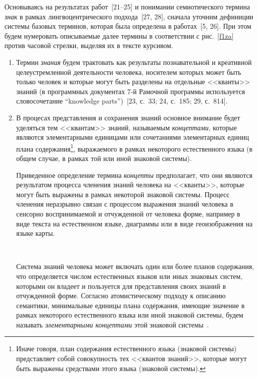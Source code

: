 \begin{multicols}{2}
   Основываясь на результатах работ~[21--25] и понимании семиотического термина
\textit{знак} в рамках лингвоцентрического подхода~[27, 28], сначала уточним дефиниции
системы базовых терминов, которая была определена в работах~[5, 26]. При этом будем
нумеровать описываемые далее термины в соответствии с рис.~\ref{f1za} против часовой
стрелки, выделяя их в тексте курсивом.
   \begin{enumerate}[1.]
   \item Термин \textit{знания} будем трактовать как результаты познавательной и
креативной целеустремленной деятельности человека, носителем которых может быть
только человек и которые могут быть разделены на отдельные <<кванты>> знаний (в
программных документах 7-й Рамочной программы используется словосочетание
``knowledge parts'')~[23, с.~33; 24, с.~185; 29, с.~814].
   \item В процесах представления и сохранения знаний основное внимание будет уделяться
тем <<квантам>> знаний, называемым \textit{концептами}, которые являются
элементарными единицами или сочетаниями элементарных единиц плана
содержания\footnote{Иначе говоря, план содержания естественного языка (знаковой системы)
представляет собой совокупность тех <<квантов знаний>>, которые могут быть выражены средствами
этого языка (знаковой системы).}, выражаемого в рамках некоторого естественного языка (в
общем случае, в рамках той или иной знаковой системы).

   Приведенное определение термина \textit{концепты} предполагает, что они являются
результатом процесса членения знаний человека на <<кванты>>, которые могут быть
выражены в рамках некоторой знаковой системы. Процесс членения неразрывно связан с
процессом выражения знаний человека в сенсорно воспринимаемой и от\-чуж\-ден\-ной от
человека форме, например в виде текста на естественном языке, диаграммы или в виде
геоизображения на языке карты.
   \begin{figure*} %
\vspace*{1pt}
\begin{center}
\mbox{%
\epsfxsize=113.873mm
}
\end{center}
\vspace*{-9pt}
   \end{figure*}

   Система знаний человека может включать один или более планов содержания, что
определяется числом естественных языков или иных знаковых систем, которыми он владеет
и пользуется для представления своих знаний в отчужденной форме. Согласно
атомистическому подходу к описанию семантики, минимальные единицы плана содержания,
имеющие значение в рамках некоторого естественного языка или иной знаковой системы,
будем называть \textit{элементарными концептами} этой знаковой системы~\cite{30za}.


\end{enumerate}
\end{multicols}
